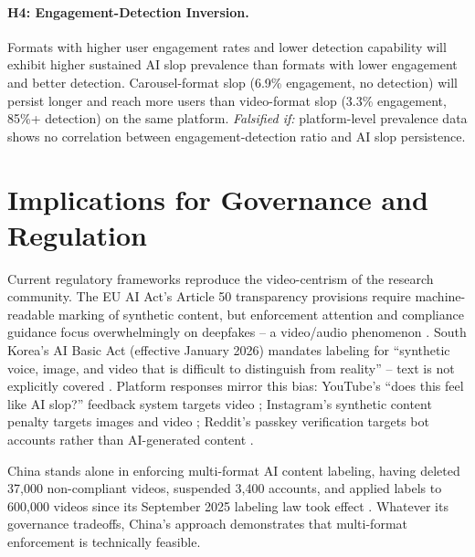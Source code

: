 \documentclass[12pt]{article}
\begin{document}
\paragraph{H4: Engagement-Detection Inversion.} Formats with higher user engagement rates and lower detection capability will exhibit higher sustained AI slop prevalence than formats with lower engagement and better detection. Carousel-format slop (6.9\% engagement, no detection) will persist longer and reach more users than video-format slop (3.3\% engagement, 85\%+ detection) on the same platform. \textit{Falsified if:} platform-level prevalence data shows no correlation between engagement-detection ratio and AI slop persistence.

\section{Implications for Governance and Regulation}

Current regulatory frameworks reproduce the video-centrism of the research community. The EU AI Act's Article 50 transparency provisions require machine-readable marking of synthetic content, but enforcement attention and compliance guidance focus overwhelmingly on deepfakes -- a video/audio phenomenon \cite{euaiact2026}. South Korea's AI Basic Act (effective January 2026) mandates labeling for ``synthetic voice, image, and video that is difficult to distinguish from reality'' -- text is not explicitly covered \cite{koreaaiact2026}. Platform responses mirror this bias: YouTube's ``does this feel like AI slop?'' feedback system targets video \cite{dexerto2026youtube}; Instagram's synthetic content penalty targets images and video \cite{clippie2026instagram}; Reddit's passkey verification targets bot accounts rather than AI-generated content \cite{reddit2026}.

China stands alone in enforcing multi-format AI content labeling, having deleted 37,000 non-compliant videos, suspended 3,400 accounts, and applied labels to 600,000 videos since its September 2025 labeling law took effect \cite{china2025labeling}. Whatever its governance tradeoffs, China's approach demonstrates that multi-format enforcement is technically feasible.
\end{document}

